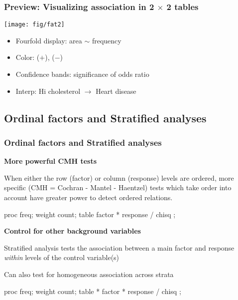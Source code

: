 \begin{frame}[fragile]
  \frametitle{Preview: Visualizing association in 2 $\times$ 2 tables}
 \begin{minipage}[c]{.5\linewidth}
  \centering
  \texttt{[image: fig/fat2]}
 \end{minipage}%
 \begin{minipage}[c]{.5\linewidth}
   \begin{itemize}
    \item Fourfold display: area $\sim$ frequency
    \item Color:  ($+$), ($-$)
    \item Confidence bands: significance of odds ratio
    \item Interp: Hi cholesterol $\rightarrow$ Heart disease
   \end{itemize}
 \end{minipage}
\vspace{1ex}
\begin{listing}[frame=single]
\end{listing}

\end{frame}

\subsection{Ordinal factors and Stratified analyses}
\begin{frame}[fragile]
  \frametitle{Ordinal factors and Stratified analyses}

  \begin{block}{\large\bfseries More powerful CMH tests}
      \begin{itemize*}
	  \item When either the row (factor) or column (response) levels are
	  \alert{ordered}, more specific (CMH = Cochran - Mantel - Haentzel) tests
	  which take order into account have greater power to detect ordered
	  relations.
\begin{listing}[frame=single]
proc freq;
   weight count;
   table factor * response / chisq ; 
\end{listing}
	  \end{itemize*}
  \end{block}
  \begin{block}{\large\bfseries Control for other background variables} 
      \begin{itemize*}
	    \item Stratified analysis tests the association between a main
		factor and response \emph{within}  levels of the control
		variable(s)
		\item Can also test for homogeneous association across strata
\begin{listing}[frame=single]
proc freq;
   weight count;
   table  * factor * response / chisq ; 
\end{listing}
	  \end{itemize*}
  \end{block}
\end{frame}

